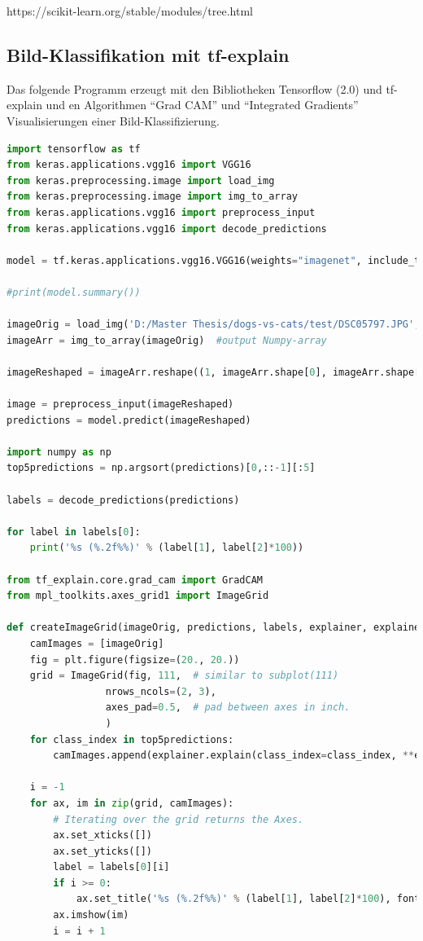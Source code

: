 \documentclass[
  12pt, %
  a4paper, %
  oneside, %
  openany, 
  numbers=noenddot, %
  BCOR=5mm, %
  parskip=half*, %
  thesis, %
]{bfhbook}
\begin{document}
https://scikit-learn.org/stable/modules/tree.html

\subsection{Bild-Klassifikation mit tf-explain}
Das folgende Programm erzeugt mit den Bibliotheken Tensorflow (2.0) und tf-explain und en Algorithmen ``Grad CAM'' und ``Integrated Gradients'' Visualisierungen einer Bild-Klassifizierung. 
\begin{lstlisting}[language=Python, caption=Visualisiertes Neuronales Netz mit Tensorflow und tf-explain]
import tensorflow as tf
from keras.applications.vgg16 import VGG16
from keras.preprocessing.image import load_img
from keras.preprocessing.image import img_to_array
from keras.applications.vgg16 import preprocess_input
from keras.applications.vgg16 import decode_predictions

model = tf.keras.applications.vgg16.VGG16(weights="imagenet", include_top=True)

#print(model.summary())

imageOrig = load_img('D:/Master Thesis/dogs-vs-cats/test/DSC05797.JPG', target_size=(224, 224))
imageArr = img_to_array(imageOrig)  #output Numpy-array

imageReshaped = imageArr.reshape((1, imageArr.shape[0], imageArr.shape[1], imageArr.shape[2]))

image = preprocess_input(imageReshaped)
predictions = model.predict(imageReshaped)

import numpy as np
top5predictions = np.argsort(predictions)[0,::-1][:5]

labels = decode_predictions(predictions)

for label in labels[0]:
    print('%s (%.2f%%)' % (label[1], label[2]*100))
    
from tf_explain.core.grad_cam import GradCAM
from mpl_toolkits.axes_grid1 import ImageGrid

def createImageGrid(imageOrig, predictions, labels, explainer, explainerArgs):
    camImages = [imageOrig]
    fig = plt.figure(figsize=(20., 20.))
    grid = ImageGrid(fig, 111,  # similar to subplot(111)
                 nrows_ncols=(2, 3),
                 axes_pad=0.5,  # pad between axes in inch.
                 )
    for class_index in top5predictions:
        camImages.append(explainer.explain(class_index=class_index, **explainerArgs))
    
    i = -1
    for ax, im in zip(grid, camImages):
        # Iterating over the grid returns the Axes.
        ax.set_xticks([])
        ax.set_yticks([])
        label = labels[0][i]
        if i >= 0:
            ax.set_title('%s (%.2f%%)' % (label[1], label[2]*100), fontsize=20)
        ax.imshow(im)
        i = i + 1


\end{lstlisting}
\end{document}
